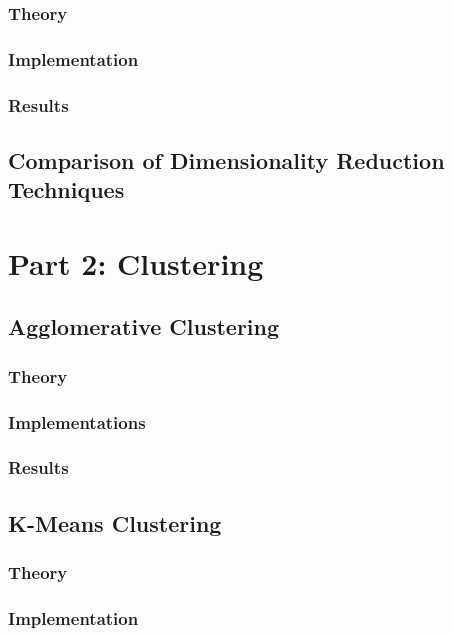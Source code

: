 \documentclass[12pt]{article}
\begin{document}
\subsubsection{Theory}

\subsubsection{Implementation}

\subsubsection{Results}

\subsection{Comparison of Dimensionality Reduction Techniques}

\section{Part 2: Clustering}
\subsection{Agglomerative Clustering}
\subsubsection{Theory}

\subsubsection{Implementations}

\subsubsection{Results}

\subsection{K-Means Clustering}
\subsubsection{Theory}

\subsubsection{Implementation}
\end{document}
